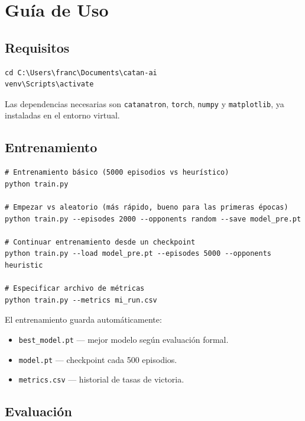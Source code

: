 \documentclass[11pt, a4paper]{article}
\begin{document}
\section{Guía de Uso}

\subsection{Requisitos}

\begin{lstlisting}[style=bash]
cd C:\Users\franc\Documents\catan-ai
venv\Scripts\activate
\end{lstlisting}

Las dependencias necesarias son \texttt{catanatron}, \texttt{torch},
\texttt{numpy} y \texttt{matplotlib}, ya instaladas en el entorno virtual.

\subsection{Entrenamiento}

\begin{lstlisting}[style=bash]
# Entrenamiento básico (5000 episodios vs heurístico)
python train.py

# Empezar vs aleatorio (más rápido, bueno para las primeras épocas)
python train.py --episodes 2000 --opponents random --save model_pre.pt

# Continuar entrenamiento desde un checkpoint
python train.py --load model_pre.pt --episodes 5000 --opponents heuristic

# Especificar archivo de métricas
python train.py --metrics mi_run.csv
\end{lstlisting}

El entrenamiento guarda automáticamente:
\begin{itemize}[noitemsep]
  \item \texttt{best\_model.pt} — mejor modelo según evaluación formal.
  \item \texttt{model.pt} — checkpoint cada 500 episodios.
  \item \texttt{metrics.csv} — historial de tasas de victoria.
\end{itemize}

\subsection{Evaluación}
\end{document}

